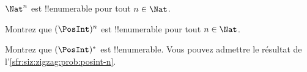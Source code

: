 \documentclass[../../../include/open-logic-section]{subfiles}
\begin{document}
\begin{prop}
$\Nat^n$ est !!{enumerable} pour tout $n \in \Nat$.
\end{prop}

\begin{prob}\label{sfr:siz:zigzag:prob:posint-n}
Montrez que $(\PosInt)^n$ est !!{enumerable} pour tout $n \in \Nat$.
\end{prob}

\begin{prob}\label{sfr:siz:zigzag:prob:posint-star}
Montrez que $(\PosInt)^*$ est !!{enumerable}.
Vous pouvez admettre le résultat de l’\cref{sfr:siz:zigzag:prob:posint-n}.
\end{prob}
\end{document}
